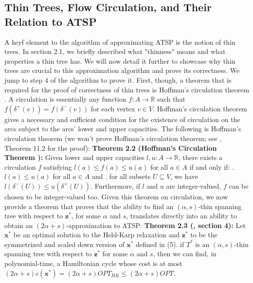 \documentclass[oneside]{projectpaper} %
\begin{document}
\subsection{Thin Trees, Flow Circulation, and Their Relation to ATSP}
A keyf element to the algorithm of approximating ATSP is the notion of thin trees. In section 2.1, we briefly described what "thinness" means and what properties a thin tree has. We will now detail it further to showcase why thin trees are crucial to this approximation algorithm and prove its correctness. \newline
\indent We jump to step 4 of the algorithm to prove it. First, though, a theorem that is required for the proof of correctness of thin trees is Hoffman's circulation theorem \cite{Sch03}. A circulation is essentially any function $f : A \rightarrow \mathbb{R}$ such that $f(\delta^+(v)) = f(\delta^-(v))$ for each vertex $v \in V$. Hoffman's circulation theorem gives a necessary and sufficient condition for the existence of circulation on the arcs subject to the arcs' lower and upper capacities. The following is Hoffman's circulation theorem (we won't prove Hoffman's circulation theorem; see \cite{Sch03}, Theorem 11.2 for the proof):
\newline
\newline
\textbf{Theorem 2.2 (Hoffman's Circulation Theorem \cite{Sch03}):} Given lower and upper capacities $l, u : A \rightarrow \mathbb{R}$, there exists a circulation $f$ satisfying $l(a) \leq f(a) \leq u(a)$ for all $a \in A$ if and only if:
\newline {}. $l(a) \leq u(a)$ for all $a \in A$ and
\newline {}. for all subsets $U \subseteq V$, we have $l(\delta^-(U)) \leq u(\delta^+(U))$.
\newline Furthermore, if $l$ and $u$ are integer-valued, $f$ can be chosen to be integer-valued too.
\newline
\newline
Given this theorem on circulation, we now provide a theorem that proves that the ability to find an $(\alpha, s)$-thin spanning tree with respect to $\textbf{z}^*$, for some $\alpha$ and $s$, translates directly into an ability to obtain an $(2\alpha + s)$-approximation to ATSP:
\newline
\newline
\textbf{Theorem 2.3 (\cite{AGM10}, section 4):} Let $\textbf{x}^*$ be an optimal solution to the Held-Karp relaxation and $\textbf{z}^*$ to be the symmetrized and scaled down version of $\textbf{x}^*$ defined in (5). if $T^*$ is an $(\alpha, s)$-thin spanning tree with respect to $\textbf{z}^*$ for some $\alpha$ and $s$, then we can find, in polynomial-time, a Hamiltonian cycle whose cost is at most $(2\alpha + s)c(\textbf{x}^*) = (2\alpha + s)OPT_{HK} \leq (2\alpha + s)OPT$.
\end{document}
